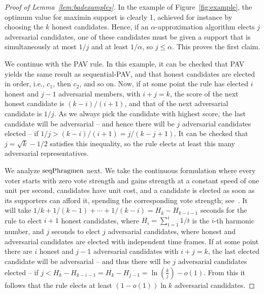 \begin{proof}[Proof of Lemma~\ref{lem:badexamples}]
In the example of Figure~\ref{fig:example}, the optimum value for  maximin support is clearly 1, achieved for instance by choosing the $k$ honest candidates. 
Hence, if an $\alpha$-approximation algorithm elects $j$ adversarial candidates, one of these candidates must be given a support that is simultaneously at most $1/j$ and at least $1/\alpha$, so $j\leq \alpha$. This proves the first claim.

We continue with the PAV rule. In this example, it can be checked that PAV yields the same result as sequential-PAV, and that honest candidates are elected in order, i.e., $c_1$, then $c_2$, and so on. 
Now, if at some point the rule has elected $i$ honest and $j-1$ adversarial members, with $i+j=k$, the score of the next honest candidate is $(k-i)/(i+1)$, and that of the next adversarial candidate is $1/j$. 
As we always pick the candidate with highest score, the last candidate will be adversarial -- and hence there will be $j$ adversarial candidates elected -- if $1/j > (k-i)/(i+1)=j/(k-j+1)$. 
It can be checked that $j=\sqrt{k}-1/2$ satisfies this inequality, so the rule elects at least this many adversarial representatives. 

We analyze $\operatorname{seqPhragmen}$ next. We take the continuous formulation where every voter starts with zero vote strength and gains strength at a constant speed of one unit per second, candidates have unit cost, and a candidate is elected as soon as its supporters can afford it, spending the corresponding vote strength; see~\cite{lackner2020approval}.  
It will take $1/k+1/(k-1)+\cdots + 1/(k-i)= H_k - H_{k-i-1}$ seconds for the rule to elect $i+1$ honest candidates, where $H_i=\sum_{t=1}^i 1/t$ is the $i$-th harmonic number, and $j$ seconds to elect $j$ adversarial candidates, where honest and adversarial candidates are elected with independent time frames. 
If at some point there are $i$ honest and $j-1$ adversarial candidates with $i+j=k$, the last elected candidate will be adversarial -- and thus there will be $j$ adversarial candidates elected -- if $j< H_k - H_{k-i-1} = H_k - H_{j-1}=\ln(\frac{k}{j}) -o(1)$. 
From this it follows that the rule elects at least $(1-o(1)) \ln k$ adversarial candidates.


\end{proof}
